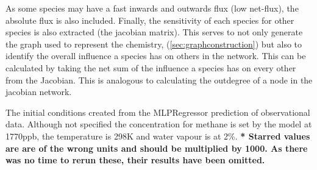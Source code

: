 As some species may have a fast inwards and outwards flux (low net-flux), the absolute flux is also included. Finally, the sensitivity of each species for other species is also extracted (the jacobian matrix). This serves to not only generate the graph used to represent the chemistry, (\autoref{sec:graphconstruction}) but also to identify the overall influence a species has on others in the network. This can be calculated by taking the net sum of the influence a species has on every other from the Jacobian. This is analogous to calculating the outdegree of a node in the jacobian network. 
\newpage
 
\begin{table}[H]
\centering
\small

\caption{The initial conditions created from the MLPRegressor prediction of observational data. Although not specified the concentration for methane is set by the model at 1770ppb, the temperature is 298K  and water vapour is at 2\%. \textbf{* Starred values are are of the wrong units and should be multiplied by 1000. As there was no time to rerun these, their results have been omitted.}}
\label{tab:icsmetric}
\end{table}

\newpage


% 

% 
% 
% 


